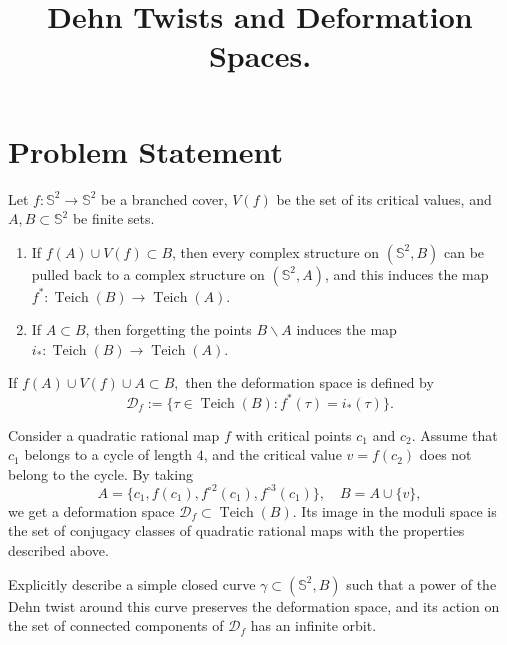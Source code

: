 \documentclass{article}
\title{Dehn Twists and Deformation Spaces.}
\begin{document}
\newcommand{\aaa}{\mathfrak{a}}
\newcommand{\cc}{\mathfrak{c}}
\newcommand{\bb}{\mathfrak{b}}
\newcommand{\C}{\mathbb{C}}
\newcommand{\CP}{\mathbb{CP}^1}
\newcommand{\Z}{\mathbb{Z}}
\newcommand{\W}{\mathcal{W}}
\newcommand{\U}{\mathcal{U}}
\newcommand{\V}{\mathcal{V}}
\newcommand{\D}{\mathcal{D}}
\newcommand{\X}{\mathcal{X}}
\newcommand{\Q}{\mathcal{Q}}
\newcommand{\M}{\mathcal{M}}
\newcommand{\Pf}{\mathcal{P}}
\newcommand{\Def}{\mathcal{D}}
\renewcommand{\S}{\mathbb{S}}
\newcommand{\e}{\varepsilon}
\newcommand{\s}{\mathfrak{s}}
\newcommand{\Per}{\operatorname{Per}}
\newcommand{\Mod}{\operatorname{Mod}}
\newcommand{\Mapp}{\operatorname{MCG}}
\newcommand{\Teich}{\operatorname{Teich}}


\newtheorem{theorem}{Theorem}[section]
\newtheorem{lemma}[theorem]{Lemma}
\newtheorem{proposition}[theorem]{Proposition}
\newtheorem{corollary}[theorem]{Corollary}
\newtheorem{conjecture}[theorem]{Conjecture}
\newtheorem{question}[theorem]{Question}

\theoremstyle{definition}
\newtheorem{definition}[theorem]{Definition}
\newtheorem{example}[theorem]{Example}
\newtheorem{construction}[theorem]{Construction}

\theoremstyle{remark}
\newtheorem{remark}[theorem]{Remark}


\section{Problem Statement}
Let $f:\S^2\to \S^2$ be a branched cover, $V(f)$ be the set of its critical values,  and $A, B\subset \S^2$ be  finite sets. 
\begin{enumerate}
\item If $f(A)\cup V(f)\subset B$, then every complex structure on $(\S^2, B)$ can be pulled back to a complex structure on $(\S^2, A)$, and this induces the map 
$f^*:\Teich(B)\to \Teich(A)$. 
\item If $A\subset B$, then forgetting the points $B\backslash A$ induces the map $i_*:\Teich(B)\to \Teich(A)$.  
\end{enumerate}
If $f(A)\cup V(f)\cup A\subset B,$ then the deformation space is defined by
$$\D_f:=\{\tau\in \Teich(B): f^*(\tau)=i_*(\tau)\}.$$ 

Consider a quadratic rational map $f$ with critical points $c_1$ and $c_2$. Assume that  $c_1$ belongs to a cycle of length $4$, and the critical value $v=f(c_2)$ does not belong to the cycle. By taking 
$$A=\{c_1, f(c_1), f^{\circ 2}(c_1), f^{\circ 3}(c_1)\}, \quad B=A\cup \{v\},$$ we get a deformation space $\D_f\subset \Teich(B)$. Its image in the moduli space is the set of conjugacy classes of quadratic rational maps with the properties described above. 

Explicitly describe a simple closed curve $\gamma\subset (\S^2, B)$ such that a power of the Dehn twist around this curve preserves the deformation space, and its action on the set of connected components of $\D_f$ has an infinite orbit. 
\end{document}
